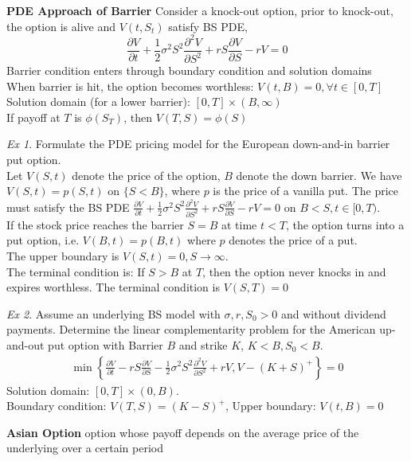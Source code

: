 \documentclass[10pt,landscape, a4paper]{article}
\theoremstyle{remark}
\newtheorem*{Ex}{Ex}
\begin{document}
\begin{multicols*}{3}
\textbf{PDE Approach of Barrier} Consider a knock-out option, prior to knock-out, the option is alive and $V(t, S_t)$ satisfy BS PDE,
$$\frac{\partial V}{\partial t} + \frac{1}{2} \sigma^2 S^2 \frac{\partial^2 V}{\partial S^2} + rS \frac{\partial V}{\partial S} - rV = 0$$
Barrier condition enters through boundary condition and solution domains\\
When barrier is hit, the option becomes worthless: $V(t, B) = 0, \forall t \in [0, T]$\\
Solution domain (for a lower barrier): $[0, T] \times (B, \infty)$\\
If payoff at $T$ is $\phi(S_T)$, then $V(T, S) = \phi(S)$
\begin{Ex}
    Formulate the PDE pricing model for the European down-and-in barrier put option.\\
    Let $V(S, t)$ denote the price of the option, $B$ denote the down barrier. We have $V(S, t) = p(S, t)$ on $\{ S<B \}$, where $p$ is the price of a vanilla put. The price must satisfy the BS PDE $\frac{\partial V}{\partial t} + \frac{1}{2} \sigma^2 S^2 \frac{\partial^2 V}{\partial S^2} + rS \frac{\partial V}{\partial S} - rV = 0$ on $B < S, t \in [0, T)$.\\
    If the stock price reaches the barrier $S=B$ at time $t <T$, the option turns into a put option, i.e. $V(B, t) = p(B, t)$ where $p$ denotes the price of a put.\\
    The upper boundary is $V(S, t) = 0, S\to \infty$.\\
    The terminal condition is: If $S>B$ at $T$, then the option never knocks in and expires worthless. The terminal condition is $V(S, T)=0$
\end{Ex}

\begin{Ex}
    Assume an underlying BS model with $\sigma,r,S_0 >0$ and without dividend payments. Determine the linear complementarity problem for the American up-and-out put option with Barrier $B$ and strike $K$, $K<B, S_0 <B$.\\
    \begin{align*}
        \min \left\{\frac{\partial V}{\partial t} - rS \frac{\partial V}{\partial S} - \frac{1}{2} \sigma^2 S^2 \frac{\partial^2 V}{\partial S^2}+rV, V-(K+S)^+\right\} = 0
    \end{align*}
    Solution domain: $[0, T]\times (0, B)$.\\ Boundary condition: $V(T, S) = (K-S)^+$, Upper boundary: $V(t, B) = 0$
\end{Ex}
\textbf{Asian Option} option whose payoff depends on the average price of the underlying over a certain period\\


\end{multicols*}
\end{document}

